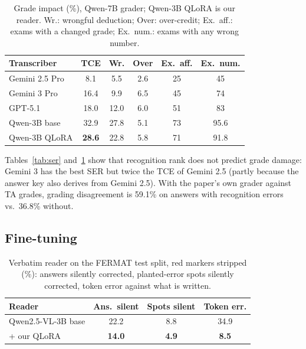 \documentclass[11pt]{article}
\begin{document}
\begin{table}[t]
\centering\footnotesize
\setlength{\tabcolsep}{3pt}
\begin{tabular}{@{}lccccc@{}}
\toprule
Transcriber & TCE & Wr. & Over & Ex.\ aff. & Ex.\ num. \\
\midrule
Gemini 2.5 Pro & 8.1 & 5.5 & 2.6 & 25 & 45 \\
Gemini 3 Pro & 16.4 & 9.9 & 6.5 & 45 & 74 \\
GPT-5.1 & 18.0 & 12.0 & 6.0 & 51 & 83 \\
Qwen-3B base & 32.9 & 27.8 & 5.1 & 73 & 95.6 \\
Qwen-3B QLoRA & \textbf{28.6} & 22.8 & 5.8 & 71 & 91.8 \\
\bottomrule
\end{tabular}
\caption{Grade impact (\%), Qwen-7B grader; Qwen-3B QLoRA is our reader. Wr.: wrongful deduction; Over: over-credit; Ex.\ aff.: exams with a changed grade; Ex.\ num.: exams with any wrong number.}
\label{tab:tce}
\end{table}

Tables~\ref{tab:ser} and~\ref{tab:tce} show that recognition rank does not predict grade damage: Gemini 3 has the best SER but twice the TCE of Gemini 2.5 (partly because the answer key also derives from Gemini 2.5). With the paper's own grader against TA grades, grading disagreement is 59.1\% on answers with recognition errors vs.\ 36.8\% without.

\subsection{Fine-tuning}

\begin{table}[t]
\centering\footnotesize
\setlength{\tabcolsep}{3pt}
\begin{tabular}{@{}lccc@{}}
\toprule
Reader & Ans.\ silent & Spots silent & Token err. \\
\midrule
Qwen2.5-VL-3B base & 22.2 & 8.8 & 34.9 \\
+ our QLoRA & \textbf{14.0} & \textbf{4.9} & \textbf{8.5} \\
\bottomrule
\end{tabular}
\caption{Verbatim reader on the FERMAT test split, red markers stripped (\%): answers silently corrected, planted-error spots silently corrected, token error against what is written.}
\label{tab:reader}
\end{table}
\end{document}
